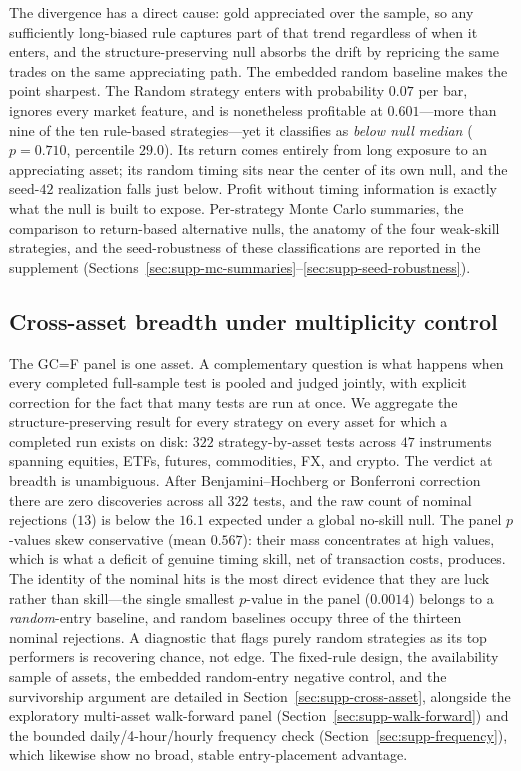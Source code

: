 The divergence has a direct cause: gold appreciated over the sample, so any sufficiently long-biased rule captures part of that trend regardless of when it enters, and the structure-preserving null absorbs the drift by repricing the same trades on the same appreciating path. The embedded random baseline makes the point sharpest. The Random strategy enters with probability $0.07$ per bar, ignores every market feature, and is nonetheless profitable at $0.601$---more than nine of the ten rule-based strategies---yet it classifies as \emph{below null median} ($p=0.710$, percentile $29.0$). Its return comes entirely from long exposure to an appreciating asset; its random timing sits near the center of its own null, and the seed-$42$ realization falls just below. Profit without timing information is exactly what the null is built to expose. Per-strategy Monte Carlo summaries, the comparison to return-based alternative nulls, the anatomy of the four weak-skill strategies, and the seed-robustness of these classifications are reported in the supplement (Sections~\ref{sec:supp-mc-summaries}--\ref{sec:supp-seed-robustness}).

\subsection{Cross-asset breadth under multiplicity control}
\label{sec:cross-asset-multiplicity}

The GC=F panel is one asset. A complementary question is what happens when every completed full-sample test is pooled and judged jointly, with explicit correction for the fact that many tests are run at once. We aggregate the structure-preserving result for every strategy on every asset for which a completed run exists on disk: $322$ strategy-by-asset tests across $47$ instruments spanning equities, ETFs, futures, commodities, FX, and crypto. The verdict at breadth is unambiguous. After Benjamini--Hochberg or Bonferroni correction there are zero discoveries across all $322$ tests, and the raw count of nominal rejections ($13$) is below the $16.1$ expected under a global no-skill null. The panel $p$-values skew conservative (mean $0.567$): their mass concentrates at high values, which is what a deficit of genuine timing skill, net of transaction costs, produces. The identity of the nominal hits is the most direct evidence that they are luck rather than skill---the single smallest $p$-value in the panel ($0.0014$) belongs to a \emph{random}-entry baseline, and random baselines occupy three of the thirteen nominal rejections. A diagnostic that flags purely random strategies as its top performers is recovering chance, not edge. The fixed-rule design, the availability sample of assets, the embedded random-entry negative control, and the survivorship argument are detailed in Section~\ref{sec:supp-cross-asset}, alongside the exploratory multi-asset walk-forward panel (Section~\ref{sec:supp-walk-forward}) and the bounded daily/4-hour/hourly frequency check (Section~\ref{sec:supp-frequency}), which likewise show no broad, stable entry-placement advantage.

